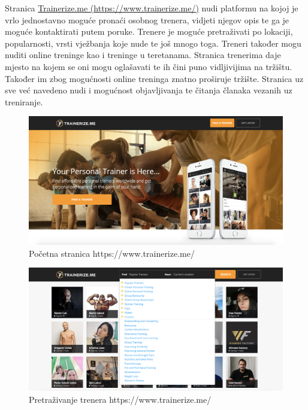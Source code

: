 		Stranica \href{https://www.trainerize.me/}{Trainerize.me (https://www.trainerize.me/)} nudi platformu na kojoj je vrlo jednostavno moguće pronaći osobnog trenera, vidjeti 
		njegov opis te ga je moguće kontaktirati putem poruke. Trenere je moguće pretraživati po lokaciji, popularnosti, vrsti vježbanja koje nude te još mnogo toga. 
		Treneri također mogu nuditi online treninge kao i treninge u teretanama. Stranica 
		trenerima daje mjesto na kojem se oni mogu oglašavati te ih čini puno vidljivijima na 
		tržištu. Također im zbog mogućnosti online treninga znatno proširuje tržište. Stranica uz sve već navedeno nudi i mogućnost objavljivanja te čitanja članaka 
		vezanih uz treniranje.
		
		\begin{figure}[H]
			\includegraphics[scale=0.20]{slike/trainerizeme1.PNG} %
			\centering
			\caption{Početna stranica https://www.trainerize.me/}
			\label{fig:promjene}
		\end{figure}
	
		\begin{figure}[H]
			\includegraphics[scale=0.20]{slike/trainerizeme2.PNG} %
			\centering
			\caption{Pretraživanje trenera https://www.trainerize.me/}
			\label{fig:promjene}
		\end{figure}
	
